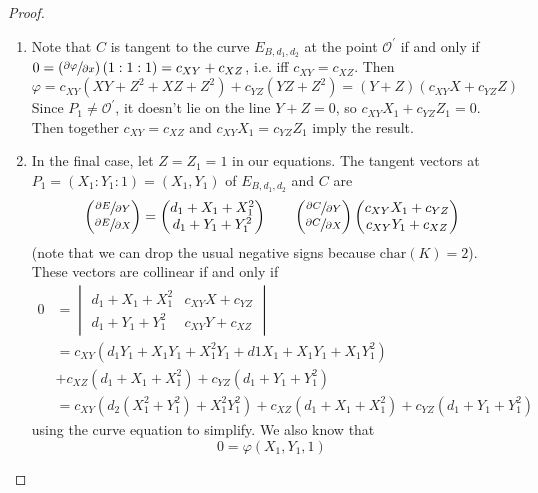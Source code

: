 \begin{proof}
\begin{enumerate}
\item
Note that $C$ is tangent to the curve $E_{B, d_1, d_2}$ at the point
    $\mathcal{O}^\prime$ if and only if $0 = \left(\sfrac{\partial\varphi}
    {\partial x}\right)(1 : 1 : 1) = c_{XY} + c_{XZ}$, i.e. iff $c_{XY} =
    c_{XZ}$.
Then
\[
\varphi
    =   c_{XY}(XY + Z^2 + XZ + Z^2) + c_{YZ}(YZ + Z^2)
    =   (Y + Z)(c_{XY}X + c_{YZ}Z)
\]
Since $P_1 \ne \mathcal{O}^\prime$, it doesn't lie on the line $Y + Z = 0$, so
    $c_{XY}X_1 + c_{YZ}Z_1 = 0$.
Then together $c_{XY} = c_{XZ}$ and $c_{XY}X_1 = c_{YZ}Z_1$ imply the result.

\item
In the final case, let $Z = Z_1 = 1$ in our equations.
The tangent vectors at $P_1 = (X_1 : Y_1 : 1) = (X_1, Y_1)$ of
    $E_{B, d_1, d_2}$ and $C$ are
\[
\begin{pmatrix}
    \sfrac{\partial E}{\partial Y} \\ \sfrac{\partial E}{\partial X}
\end{pmatrix}
=   
\begin{pmatrix}
d_1 + X_1 + X_1^2 \\ d_1 + Y_1 + Y_1^2
\end{pmatrix}
\qquad
\begin{pmatrix}
    \sfrac{\partial C}{\partial Y} \\ \sfrac{\partial C}{\partial X}
\end{pmatrix}
\begin{pmatrix}
c_{XY}X_1 + c_{YZ} \\ c_{XY}Y_1 + c_{XZ}
\end{pmatrix}
\]
    (note that we can drop the usual negative signs because $\textrm{char}(K) =
    2$).
These vectors are collinear if and only if
\begin{align*}
0
    &=  \begin{vmatrix}
        d_1 + X_1 + X_1^2   &   c_{XY}X + c_{YZ}\\
        d_1 + Y_1 + Y_1^2   &   c_{XY}Y + c_{XZ}
        \end{vmatrix}\\
    &=  c_{XY}(d_1Y_1 + X_1Y_1 + X_1^2Y_1 + d1X_1 + X_1Y_1 + X_1Y_1^2)\\
    &+c_{XZ}(d_1 + X_1 + X_1^2) + c_{YZ}(d_1 + Y_1 + Y_1^2)\\
    &=  c_{XY}(d_2(X_1^2 + Y_1^2) + X_1^2Y_1^2) +
        c_{XZ}(d_1 + X_1 + X_1^2) +
        c_{YZ}(d_1 + Y_1 + Y_1^2)
\end{align*}
    using the curve equation to simplify.
We also know that
\[
0   =   \varphi(X_1, Y_1, 1)
\]
\end{enumerate}
\end{proof}
